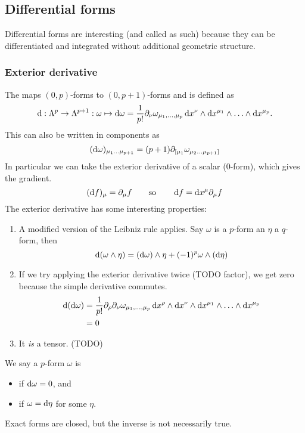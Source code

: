 \subsection{Differential forms}
Differential forms are interesting (and called as such) because they can be differentiated and integrated without additional geometric structure.

\subsubsection{Exterior derivative}
The  maps $(0,p)$-forms to $(0,p+1)$-forms and is defined as
\[ \operatorname{d \!}{}: \Lambda^p \to \Lambda^{p+1}: \omega \mapsto \operatorname{d \!}{\omega} = \frac{1}{p!}\partial_\nu\omega_{\mu_1,\ldots,\mu_p} \operatorname{d \!}{x^\nu}\wedge \operatorname{d \!}{x^{\mu_1}}\wedge \ldots \wedge \operatorname{d \!}{x^{\mu_p}}. \]
This can also be written in components as
\[ (\operatorname{d \!}{\omega})_{\mu_1\ldots\mu_{p+1}} = (p+1)\partial_{[\mu_1}\omega_{\mu_2\ldots\mu_{p+1}]} \]
In particular we can take the exterior derivative of a scalar ($0$-form), which gives the gradient.
\[ (\operatorname{d \!}{f})_\mu = \partial_\mu f \qquad \text{so} \qquad \operatorname{d \!}{f} = \operatorname{d \!}{x^\mu}\partial_\mu f \]
The exterior derivative has some interesting properties:
\begin{enumerate}
\item A modified version of the Leibniz rule applies. Say $\omega$ is a $p$-form an $\eta$ a $q$-form, then
\[ \operatorname{d \!}{(\omega \wedge \eta)} = (\operatorname{d \!}{\omega})\wedge \eta + (-1)^p\omega\wedge (\operatorname{d \!}{\eta}) \] 
\item If we try applying the exterior derivative twice (TODO factor), we get zero because the simple derivative commutes.
\begin{align}
\operatorname{d \!}{(\operatorname{d \!}{\omega})} &= \frac{1}{p!}\partial_\rho\partial_\nu\omega_{\mu_1,\ldots,\mu_p} \operatorname{d \!}{x^\rho}\wedge\operatorname{d \!}{x^\nu}\wedge \operatorname{d \!}{x^{\mu_1}}\wedge \ldots \wedge \operatorname{d \!}{x^{\mu_p}} \\
&= 0
\end{align}
\item It \textit{is} a tensor. (TODO)
\end{enumerate}
We say a $p$-form $\omega$ is
\begin{itemize}
\item {} if $\operatorname{d \!}{\omega} = 0$, and
\item {} if $\omega = \operatorname{d \!}{\eta}$ for some $\eta$.
\end{itemize}
Exact forms are closed, but the inverse is not necessarily true.

